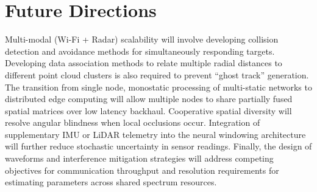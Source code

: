 \section{Future Directions}
\label{sec:future}

Multi-modal (Wi-Fi + Radar) scalability will involve developing collision detection and avoidance methods for simultaneously responding targets. Developing data association methods to relate multiple radial distances to different point cloud clusters is also required to prevent ``ghost track'' generation. The transition from single node, monostatic processing of multi-static networks to distributed edge computing will allow multiple nodes to share partially fused spatial matrices over low latency backhaul. Cooperative spatial diversity will resolve angular blindness when local occlusions occur. Integration of supplementary IMU or LiDAR telemetry into the neural windowing architecture will further reduce stochastic uncertainty in sensor readings. Finally, the design of waveforms and interference mitigation strategies will address competing objectives for communication throughput and resolution requirements for estimating parameters across shared spectrum resources.
